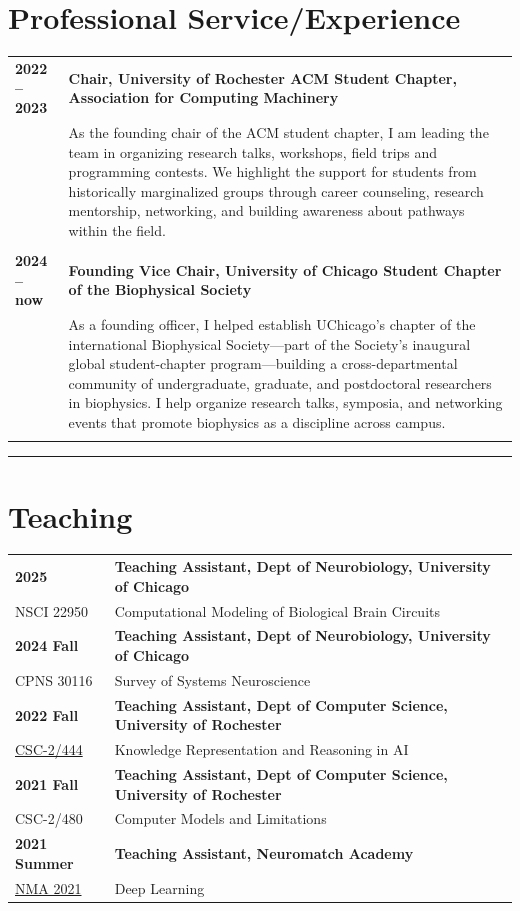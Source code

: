 \documentclass[10pt,letterpaper]{article}
\begin{document}
\section{Professional Service/Experience}
\begin{tabularx}{\textwidth}{@{}l X@{}}

\textbf{2022 -- 2023} & \textbf{Chair, University of Rochester ACM Student Chapter, Association for Computing Machinery} \\
 & As the founding chair of the ACM student chapter, I am leading the team in organizing  research talks, workshops, field trips and programming contests. We highlight the  support for students from historically marginalized groups through career counseling,  research mentorship, networking, and building awareness about pathways within the field.\\
 \\
\textbf{2024 -- now} & \textbf{Founding Vice Chair, University of Chicago Student Chapter of the Biophysical Society} \\
 & As a founding officer, I helped establish UChicago's chapter of the international  Biophysical Society—part of the Society's inaugural global student-chapter  program—building a cross-departmental community of undergraduate, graduate, and  postdoctoral researchers in biophysics. I help organize research talks, symposia,  and networking events that promote biophysics as a discipline across campus.\\
\\

\end{tabularx}


\medskip\hrule\medskip

\section{Teaching}
\vspace{1mm}
\begin{tabular}{@{}l l@{}}
\textbf{2025 } & \textbf{Teaching Assistant, Dept of Neurobiology, University of Chicago} \\
NSCI 22950 &  Computational Modeling of Biological Brain Circuits\\
\textbf{2024 Fall} & \textbf{Teaching Assistant, Dept of Neurobiology, University of Chicago} \\
CPNS 30116 & Survey of Systems Neuroscience\\
\textbf{2022 Fall} & \textbf{Teaching Assistant, Dept of Computer Science, University of Rochester} \\
 \href{https://www.cs.rochester.edu/~schubert/444/}{CSC-2/444} & Knowledge Representation and Reasoning in AI
\\
\textbf{2021 Fall} & \textbf{Teaching Assistant, Dept of Computer Science, University of Rochester} \\
 CSC-2/480 & Computer Models and Limitations
\\
\textbf{2021 Summer} & \textbf{Teaching Assistant, Neuromatch Academy} \\
 \href{https://portal.neuromatchacademy.org/certificate/1396ef2e-1050-4e45-82de-d95765114bc4}{NMA 2021 } & Deep Learning
\end{tabular}
\end{document}
